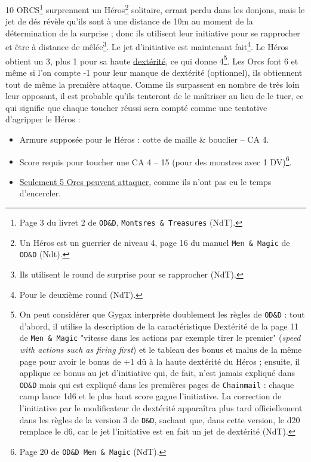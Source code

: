 10 ORCS\footnote{
    Page 3 du livret 2 de \texttt{OD\&D}, \texttt{Montsres \& Treasures} (NdT).
} surprennent un Héros\footnote{
    Un Héros est un guerrier de niveau 4, page 16 du manuel \texttt{Men \& Magic} de \texttt{OD\&D} (Ndt).
} solitaire, errant perdu dans les donjons, mais le jet de dés révèle qu'ils sont à une distance de 10m au moment de la détermination de la surprise ; donc ils utilisent leur initiative pour se rapprocher et être à distance de mêlée\footnote{
    Ils utilisent le round de surprise pour se rapprocher (NdT).
}. Le jet d'initiative est maintenant fait\footnote{
    Pour le deuxième round (NdT).
}. Le Héros obtient un 3, plus 1 pour sa haute \uline{dextérité}, ce qui donne 4\footnote{
    On peut considérer que Gygax interprète doublement les règles de \texttt{OD\&D} : tout d'abord, il utilise la description de la caractéristique Dextérité de la page 11 de \texttt{Men \& Magic} "vitesse dans les actions par exemple tirer le premier" (\textit{speed with actions such as firing first}) et le tableau des bonus et malus de la même page pour avoir le bonus de +1 dû à la haute dextérité du Héros ; ensuite, il applique ce bonus au jet d'initiative qui, de fait, n'est jamais expliqué dans \texttt{OD\&D} mais qui est expliqué dans les premières pages de \texttt{Chainmail} : chaque camp lance 1d6 et le plus haut score gagne l'initiative. La correction de l'initiative par le modificateur de dextérité apparaîtra plus tard officiellement dans les règles de la version 3 de \texttt{D\&D}, sachant que, dans cette version, le d20 remplace le d6, car le jet l'initiative est en fait un jet de dextérité (NdT).
}. Les Orcs font 6 et même si l'on compte -1 pour leur manque de dextérité (optionnel), ils obtiennent tout de même la première attaque. Comme ils surpassent en nombre de très loin leur opposant, il est probable qu'ils tenteront de le maîtriser au lieu de le tuer, ce qui signifie que chaque toucher réussi sera compté comme une tentative d'agripper le Héros :

\medskip

\begin{itemize}
\item Armure supposée pour le Héros : cotte de maille \& bouclier -- CA 4.
\item Score requis pour toucher une CA 4 -- 15 (pour des monstres avec 1 DV)\footnote{
    Page 20 de \texttt{OD\&D Men \& Magic} (NdT).
}.
\item \uline{Seulement 5 Orcs peuvent attaquer}, comme ils n'ont pas eu le temps d'encercler.
\end{itemize}

